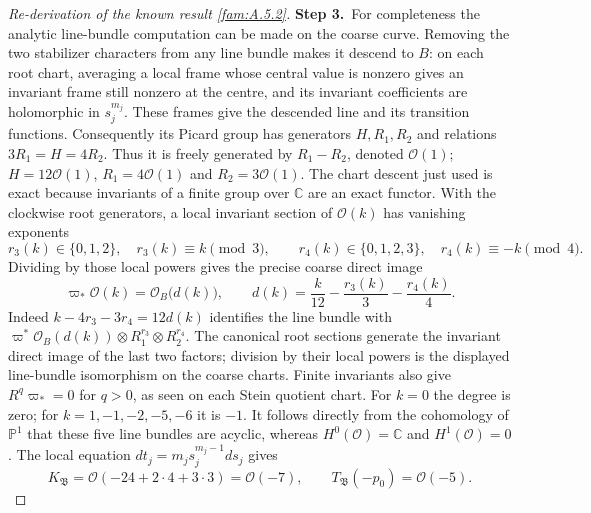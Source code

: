 \begin{proof}[Re-derivation of the known result \ref{fam:A.5.2}]
\par\smallskip\noindent\textbf{Step 3.}\ For completeness the analytic line-bundle computation can be made on
the coarse curve. Removing the two stabilizer characters from any line
bundle makes it descend to $B$: on each root chart, averaging a local
frame whose central value is nonzero gives an invariant frame still
nonzero at the centre, and its invariant coefficients are holomorphic
in $s_j^{m_j}$. These frames give the descended line and its transition
functions. Consequently its Picard group has
generators $H,R_1,R_2$ and relations $3R_1=H=4R_2$.
Thus it is freely generated by $R_1-R_2$, denoted $\mathcal O(1)$;
$H=12\mathcal O(1)$, $R_1=4\mathcal O(1)$ and
$R_2=3\mathcal O(1)$. The chart descent just used is exact because
invariants of a finite group over $\mathbb C$ are an exact functor.
With the clockwise root generators, a local invariant section of
$\mathcal O(k)$ has vanishing exponents
\[
 r_3(k)\in\{0,1,2\},\quad r_3(k)\equiv k\pmod3,
 \qquad
 r_4(k)\in\{0,1,2,3\},\quad r_4(k)\equiv-k\pmod4.
\]
Dividing by those local powers gives the precise coarse direct image
\begin{equation}\label{fam:eq:ab-root-degree}
 \varpi_*\mathcal O(k)=\mathcal O_B\bigl(d(k)\bigr),\qquad
 d(k)=\frac{k}{12}-\frac{r_3(k)}3-\frac{r_4(k)}4.
\end{equation}
Indeed $k-4r_3-3r_4=12d(k)$ identifies the line bundle with
$\varpi^*\mathcal O_B(d(k))\otimes R_1^{r_3}\otimes R_2^{r_4}$.
The canonical root sections generate the invariant direct image of
the last two factors; division by their local powers is the displayed
line-bundle isomorphism on the coarse charts. Finite invariants also give
$R^q\varpi_*=0$ for $q>0$, as seen on each Stein quotient chart.
For $k=0$ the degree is zero; for
$k=1,-1,-2,-5,-6$ it is $-1$. It follows directly from the
cohomology of $\mathbb P^1$ that these five line bundles are acyclic,
whereas $H^0(\mathcal O)=\mathbb C$ and $H^1(\mathcal O)=0$.
The local equation $dt_j=m_js_j^{m_j-1}ds_j$ gives
\[
 K_{\mathfrak B}=\mathcal O(-24+2\cdot4+3\cdot3)
 =\mathcal O(-7),\qquad
 T_{\mathfrak B}(-p_0)=\mathcal O(-5).
\]


\end{proof}
